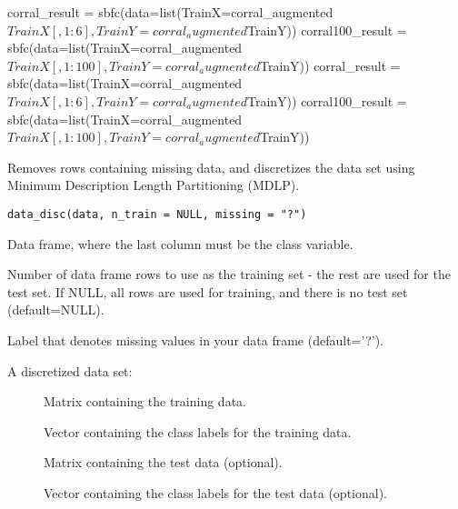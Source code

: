 \documentclass[a4paper]{book}
\begin{document}
%
\begin{Examples}
\begin{ExampleCode}
corral_result = sbfc(data=list(TrainX=corral_augmented$TrainX[,1:6],
                                         TrainY = corral_augmented$TrainY))
corral100_result = sbfc(data=list(TrainX=corral_augmented$TrainX[,1:100], 
                                  TrainY = corral_augmented$TrainY))
corral_result = sbfc(data=list(TrainX=corral_augmented$TrainX[,1:6],
                                         TrainY = corral_augmented$TrainY))
corral100_result = sbfc(data=list(TrainX=corral_augmented$TrainX[,1:100], 
                                  TrainY = corral_augmented$TrainY))
\end{ExampleCode}
\end{Examples}
%
\begin{Description}\relax
Removes rows containing missing data, and discretizes the data set using Minimum Description Length Partitioning (MDLP).
\end{Description}
%
\begin{Usage}
\begin{verbatim}
data_disc(data, n_train = NULL, missing = "?")
\end{verbatim}
\end{Usage}
%
\begin{Arguments}
\begin{ldescription}
\item[\code{data}] Data frame, where the last column must be the class variable.

\item[\code{n\_train}] Number of data frame rows to use as the training set - the rest are used for the test set. If NULL, all rows are used for training, and there is no test set (default=NULL).

\item[\code{missing}] Label that denotes missing values in your data frame (default='?').
\end{ldescription}
\end{Arguments}
%
\begin{Value}
A discretized data set:
\begin{description}
     
\item[] Matrix containing the training data.
\item[] Vector containing the class labels for the training data.
\item[] Matrix containing the test data (optional).
\item[] Vector containing the class labels for the test data (optional).

\end{description}

\end{Value}
\end{document}

